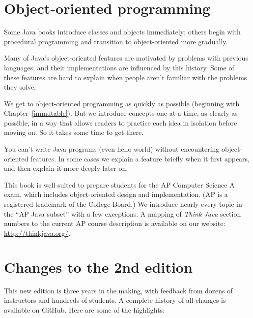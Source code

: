 \section*{Object-oriented programming}

Some Java books introduce classes and objects immediately; others begin with procedural programming and transition to object-oriented more gradually.

Many of Java's object-oriented features are motivated by problems with previous languages, and their implementations are influenced by this history.
Some of these features are hard to explain when people aren't familiar with the problems they solve.

We get to object-oriented programming as quickly as possible (beginning with Chapter~\ref{immutable}).
But we introduce concepts one at a time, as clearly as possible, in a way that allows readers to practice each idea in isolation before moving on.
So it takes some time to get there.

You can't write Java programs (even hello world) without encountering object-oriented features.
In some cases we explain a feature briefly when it first appears, and then explain it more deeply later on.

This book is well suited to prepare students for the AP Computer Science A exam, which includes object-oriented design and implementation.
(AP is a registered trademark of the College Board.)
We introduce nearly every topic in the ``AP Java subset'' with a few exceptions.
A mapping of {\it Think Java} section numbers to the current AP course description is available on our website: \url{http://thinkjava.org/}.


\section*{Changes to the 2nd edition}

This new edition is three years in the making, with feedback from dozens of instructors and hundreds of students.
A complete history of all changes is available on GitHub.
Here are some of the highlights:


